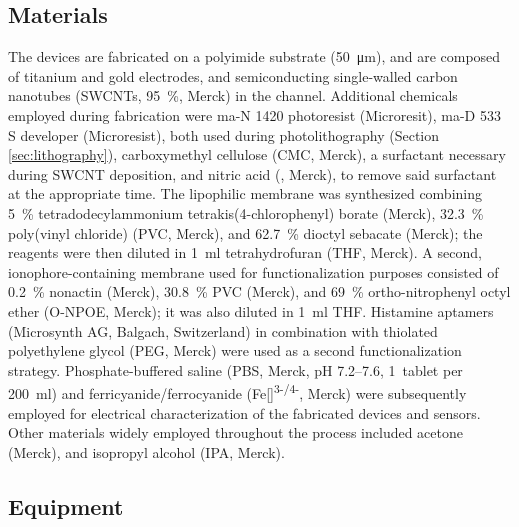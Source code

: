 \subsection{Materials}

The devices are fabricated on a polyimide substrate (\SI{50}{\um}), and are
composed of titanium and gold electrodes, and semiconducting single-walled
carbon nanotubes (SWCNTs, \SI{95}{\%}, Merck) in the channel. Additional
chemicals employed during fabrication were ma-N 1420 photoresist (Microresit),
ma-D 533 S developer (Microresist), both used during photolithography (Section
\ref{sec:lithography}), carboxymethyl cellulose (CMC, Merck), a surfactant
necessary during SWCNT deposition, and nitric acid (, Merck), to remove
said surfactant at the appropriate time. The lipophilic membrane was synthesized
combining \SI{5}{\%} tetradodecylammonium tetrakis(4-chlorophenyl) borate
(Merck), \SI{32.3}{\%} poly(vinyl chloride) (PVC, Merck), and \SI{62.7}{\%}
dioctyl sebacate (Merck); the reagents were then diluted in \SI{1}{\ml}
tetrahydrofuran (THF, Merck). A second, ionophore-containing membrane used for
functionalization purposes consisted of \SI{0.2}{\%} nonactin (Merck),
\SI{30.8}{\%} PVC (Merck), and \SI{69}{\%} ortho-nitrophenyl octyl ether
(O-NPOE, Merck); it was also diluted in \SI{1}{\ml} THF. Histamine aptamers
(Microsynth AG, Balgach, Switzerland) in combination with thiolated polyethylene
glycol (PEG, Merck) were used as a second functionalization strategy.
Phosphate-buffered saline (PBS, Merck, pH 7.2--7.6, \SI{1}{tablet} per
\SI{200}{\ml}) and ferricyanide/ferrocyanide
(Fe[]\textsuperscript{3-/4-}, Merck) were subsequently employed for
electrical characterization of the fabricated devices and sensors. Other
materials widely employed throughout the process included acetone (Merck), and
isopropyl alcohol (IPA, Merck).

\subsection{Equipment}


